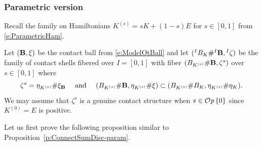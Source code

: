 \documentclass[12pt]{paper}
\theoremstyle{plain}
\theoremstyle{definition}
\newcommand{\B}{{\bf B}}
\def\Op{{\mathcal O}{\it p}\,}
\numberwithin{figure}{section}
\begin{document}




\subsubsection{Parametric version}\label{sec:final-filling}
Recall the family on Hamiltonians $K^{(s)}=sK +(1-s)E$ for $s\in[0,1]$ from \eqref{e:ParametricHam}.

Let $(\B, \xi)$ be the contact ball from \eqref{e:ModelOtBall} and
let $({}^I B_K \# {}^I \B, {}^I \zeta)$ be the family of contact shells fibered over $I = [0,1]$ 
with fiber $(B_{K^{(s)}} \# \B, \zeta^s)$ over $s \in [0,1]$ where
$$ 
	 \zeta^s = \eta_{K^{(s)}} \# \xi_\B \quad\mbox{ and }\quad
	 (B_{K^{(s)}}\# \B, \eta_{K^{(s)}} \# \xi) \subset (B_{K^{(s)}}\# B_{K}, \eta_{K^{(s)}} \# \eta_K).
$$ 
We may assume  that $\zeta^s$ is a genuine contact structure when $s \in \Op\{0\}$ since 
$K^{(0)} = E$ is positive.

Let us first prove the following proposition similar to Proposition~\ref{p:ConnectSumDisc-param}.
\end{document}
